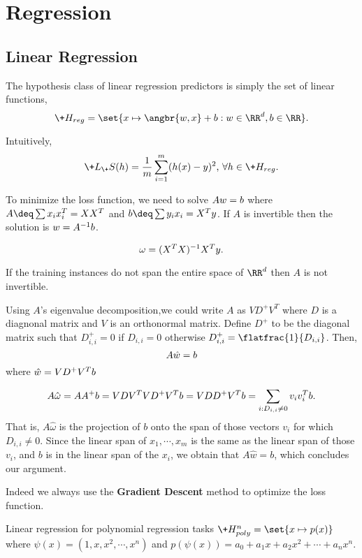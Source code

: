 \section{Regression}

\subsection{Linear Regression}

The hypothesis class of linear regression predictors is simply the set of linear functions,
\[
	\+H_{reg}=\set{\*x\mapsto \angbr{\*w,\*x}+b:\*w\in\RR^d,b\in\RR}
.\] 

Intuitively, 
\[
	\+L_\+S(h)=\frac{1}{m}\sum_{i=1}^m(h(\*x)-\*y)^2\mbox{, }\forall h\in\+H_{reg}
.\]

To minimize the loss function, we need to solve $A\*w=\*b$ where $A\deq\sum\*x_i\*x_i^T=XX^T$ and $\*b\deq\sum y_i\*x_i=X^T\*y$.
If $A$ is invertible then the solution is $w=A^{-1}\*b$.

\begin{thm}
	\[
		\omega=(X^TX)^{-1}X^T\*y
	.\] 
\end{thm}

If the training instances do not span the entire space of $\RR^d$ then $A$ is not invertible.

\begin{thm}
	Using $A$'s eigenvalue decomposition,we could write $A$ as $VD^+V^T$ where $D$ is a diagnonal matrix and  $V$ is an orthonormal matrix. Define $D^+$ to be the diagonal matrix such that $D^+_{i,i}=0$ if  $D_{i,i}=0$ otherwise  $D^+_{i,i}=\flatfrac{1}{D_{i,i}}$. Then,
	\[A\*{\hat{w}}=\*b\]
	where $\*{\hat{w}}=VD^+V^T\*b$
\end{thm}
\begin{prf}
	\[
		A\hat{\omega}=AA^+\*b=VDV^TVD^+V^T\*b=VDD^+V^T\*b=\sum_{i:D_{i,i}\ne 0}\*v_i\*v_i^T\*b
	.\]
	That is, $A\hat{\omega}$ is the projection of $b$ onto the span of those vectors $v_i$ for which $D_{i,i}\ne0$. Since the linear span of $x_1,\cdots,x_m$ is the same as the linear span of those $v_i$, and $b$ is in the linear span of the $x_i$, we obtain that $A\hat{w} = b$, which concludes our argument.
\end{prf}

\begin{remark}
	Indeed we always use the \textbf{Gradient Descent} method to optimize the loss function.
\end{remark}

Linear regression for polynomial regression tasks $\+H^n_{poly}=\set{x\mapsto p(x)}$ where $\psi(x)=(1,x,x^2,\cdots,x^n)$ and $p(\psi(x))=a_0+a_1x+a_2x^2+\cdots+a_nx^n$.

